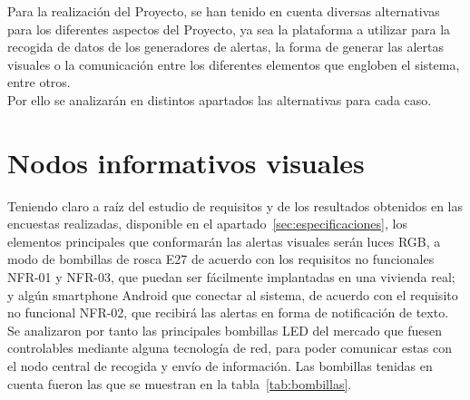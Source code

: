 Para la realización del Proyecto, se han tenido en cuenta diversas alternativas para los diferentes aspectos del Proyecto, ya sea la plataforma a utilizar para la recogida de datos de los generadores de alertas, la forma de generar las alertas visuales o la comunicación entre los diferentes elementos que engloben el sistema, entre otros. \\

Por ello se analizarán en distintos apartados las alternativas para cada caso.

\section{Nodos informativos visuales}
Teniendo claro a raíz del estudio de requisitos y de los resultados obtenidos en las encuestas realizadas, disponible en el apartado~\ref{sec:especificaciones}, los elementos principales que conformarán las alertas visuales serán luces RGB, a modo de bombillas de rosca E27 de acuerdo con los requisitos no funcionales NFR-01 y NFR-03, que puedan ser fácilmente implantadas en una vivienda real; y algún smartphone Android que conectar al sistema, de acuerdo con el requisito no funcional NFR-02, que recibirá las alertas en forma de notificación de texto.\\

Se analizaron por tanto las principales bombillas LED del mercado que fuesen controlables mediante alguna tecnología de red, para poder comunicar estas con el nodo central de recogida y envío de información. Las bombillas tenidas en cuenta fueron las que se muestran en la tabla~\ref{tab:bombillas}. \\

